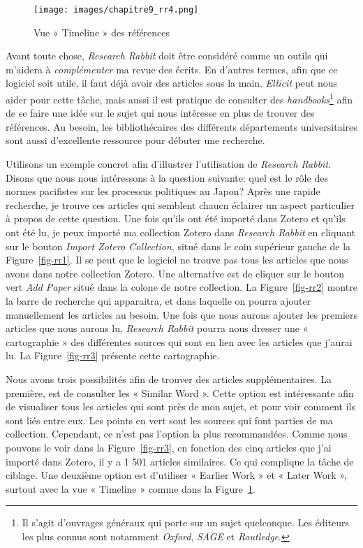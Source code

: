 \documentclass[
  letterpaper,
  DIV=11,
  numbers=noendperiod]{scrreprt}
\begin{document}
\begin{figure}

{\centering \texttt{[image: images/chapitre9\_rr4.png]}

}

\caption{\label{fig-rr4}Vue « Timeline » des références}

\end{figure}

Avant toute chose, \emph{Research Rabbit} doit être considéré comme un
outils qui m'aidera à \emph{complémenter} ma revue des écrits. En
d'autres termes, afin que ce logiciel soit utile, il faut déjà avoir des
articles sous la main. \emph{Ellicit} peut nous aider pour cette tâche,
mais aussi il est pratique de consulter des \emph{handbooks}\footnote{Il
  s'agit d'ouvrages généraux qui porte sur un sujet quelconque. Les
  éditeurs les plus connus sont notamment \emph{Oxford}, \emph{SAGE} et
  \emph{Routledge}.} afin de se faire une idée sur le sujet qui nous
intéresse en plus de trouver des références. Au besoin, les
bibliothécaires des différents départements universitaires sont aussi
d'excellente ressource pour débuter une recherche.

Utilisons un exemple concret afin d'illustrer l'utilisation de
\emph{Research Rabbit}. Disons que nous nous intéressons à la question
suivante: quel est le rôle des normes pacifistes sur les processus
politiques au Japon? Après une rapide recherche, je trouve ces articles
qui semblent chaucn éclairer un aspect particulier à propos de cette
question. Une fois qu'ils ont été importé dans Zotero et qu'ils ont été
lu, je peux importé ma collection Zotero dans \emph{Research Rabbit} en
cliquant sur le bouton \emph{Import Zotero Collection}, situé dans le
coin supérieur gauche de la Figure~\ref{fig-rr1}. Il se peut que le
logiciel ne trouve pas tous les articles que nous avons dans notre
collection Zotero. Une alternative est de cliquer sur le bouton vert
\emph{Add Paper} situé dans la colone de notre collection. La
Figure~\ref{fig-rr2} montre la barre de recherche qui apparaitra, et
dans laquelle on pourra ajouter manuellement les articles au besoin. Une
fois que nous aurons ajouter les premiers articles que nous aurons lu,
\emph{Research Rabbit} pourra nous dresser une « cartographie » des
différentes sources qui sont en lien avec les articles que j'aurai lu.
La Figure~\ref{fig-rr3} présente cette cartographie.

Nous avons trois possibilités afin de trouver des articles
supplémentaires. La première, est de consulter les « Similar Word ».
Cette option est intéressante afin de visualiser tous les articles qui
sont près de mon sujet, et pour voir comment ils sont liés entre eux.
Les points en vert sont les sources qui font parties de ma collection.
Cependant, ce n'est pas l'option la plus recommandées. Comme nous
pouvons le voir dans la Figure~\ref{fig-rr3}, en fonction des cinq
articles que j'ai importé dans Zotero, il y a 1 501 articles similaires.
Ce qui complique la tâche de ciblage. Une deuxième option est d'utiliser
« Earlier Work » et « Later Work », surtout avec la vue « Timeline »
comme dans la Figure~\ref{fig-rr4}.
\end{document}
